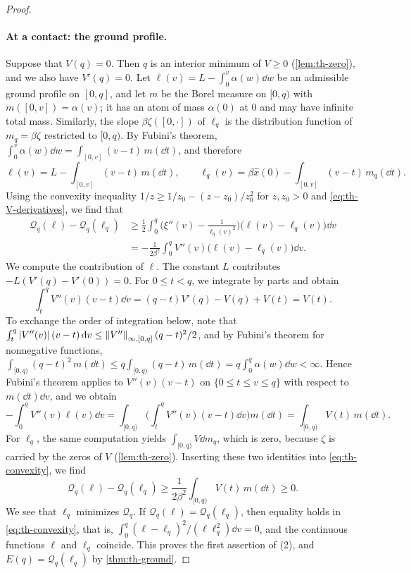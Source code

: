 \begin{proof}
\paragraph{At a contact: the ground profile.}
Suppose that $V(q)=0$. Then $q$ is an interior minimum of $V\ge0$ (\cref{lem:th-zero}), and we also have $V'(q)=0$. Let $\ell(v)=L-\int_0^v\alpha(w)\dd w$ be an admissible ground profile on $[0,q]$, and let $m$ be the Borel measure on $[0,q)$ with $m([0,v])=\alpha(v)$; it has an atom of mass $\alpha(0)$ at $0$ and may have infinite total mass. Similarly, the slope $\beta\zeta([0,\cdot])$ of $\ell_q$ is the distribution function of $m_q=\beta\zeta$ restricted to $[0,q)$. By Fubini's theorem, $\int_0^v\alpha(w)\dd w=\int_{[0,v]}(v-t)\,m(\dd t)$, and therefore
\[
\ell(v)=L-\int_{[0,v]}(v-t)\,m(\dd t),\qquad \ell_q(v)=\beta\hat x(0)-\int_{[0,v]}(v-t)\,m_q(\dd t).
\]
Using the convexity inequality $1/z\ge1/z_0-(z-z_0)/z_0^2$ for $z,z_0>0$ and \eqref{eq:th-V-derivatives}, we find that
\begin{equation}\label{eq:th-convexity}
\begin{split}
\mathcal Q_q(\ell)-\mathcal Q_q(\ell_q)&\ge\frac12\int_0^q\Big(\xi''(v)-\frac1{\ell_q(v)^2}\Big)\big(\ell(v)-\ell_q(v)\big)\dd v\\
&=-\frac1{2\beta^2}\int_0^qV''(v)\big(\ell(v)-\ell_q(v)\big)\dd v.
\end{split}
\end{equation}
We compute the contribution of $\ell$. The constant $L$ contributes $-L(V'(q)-V'(0))=0$. For $0\le t<q$, we integrate by parts and obtain
\[
\int_t^qV''(v)(v-t)\dd v=(q-t)V'(q)-V(q)+V(t)=V(t).
\]
To exchange the order of integration below, note that $\int_t^q\left|V''(v)\right|(v-t)\,\mathrm d v\le\left\lVert V''\right\rVert_{\infty,[0,q]}(q-t)^2/2$, and by Fubini's theorem for nonnegative functions, $\int_{[0,q)}(q-t)^2\,m(\dd t)\le q\int_{[0,q)}(q-t)\,m(\dd t)=q\int_0^q\alpha(w)\dd w<\infty$. Hence Fubini's theorem applies to $V''(v)(v-t)$ on $\{0\le t\le v\le q\}$ with respect to $m(\dd t)\dd v$, and we obtain
\[
-\int_0^qV''(v)\ell(v)\dd v=\int_{[0,q)}\Big(\int_t^qV''(v)(v-t)\dd v\Big)m(\dd t)=\int_{[0,q)}V(t)\,m(\dd t).
\]
For $\ell_q$, the same computation yields $\int_{[0,q)}V\dd m_q$, which is zero, because $\zeta$ is carried by the zeros of $V$ (\cref{lem:th-zero}). Inserting these two identities into \eqref{eq:th-convexity}, we find
\begin{equation}\label{eq:th-stieltjes}
\mathcal Q_q(\ell)-\mathcal Q_q(\ell_q)\ge\frac1{2\beta^2}\int_{[0,q)}V(t)\,m(\dd t)\ge0.
\end{equation}
We see that $\ell_q$ minimizes $\mathcal Q_q$. If $\mathcal Q_q(\ell)=\mathcal Q_q(\ell_q)$, then equality holds in \eqref{eq:th-convexity}, that is, $\int_0^q(\ell-\ell_q)^2/(\ell\ell_q^2)\dd v=0$, and the continuous functions $\ell$ and $\ell_q$ coincide. This proves the first assertion of (2), and $E(q)=\mathcal Q_q(\ell_q)$ by \cref{thm:th-ground}.


\end{proof}
